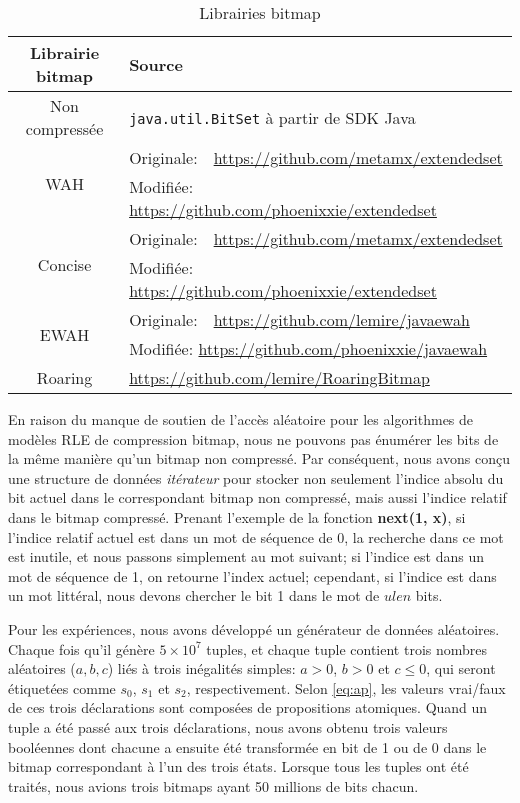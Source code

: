 \begin{table}
\centering
\begin{tabular}{|c|l|}
\hline
Librairie bitmap & Source \\
\hline
Non compressée & \texttt{java.util.BitSet} à partir de SDK Java  \\
\hline
\multirow{2}{*}{WAH} & Originale:\ \ \url{https://github.com/metamx/extendedset} \\
& Modifiée: \url{https://github.com/phoenixxie/extendedset} \\
\hline
\multirow{2}{*}{Concise} & Originale:\ \ \url{https://github.com/metamx/extendedset} \\
& Modifiée: \url{https://github.com/phoenixxie/extendedset} \\
\hline
\multirow{2}{*}{EWAH} & Originale:\ \ \url{https://github.com/lemire/javaewah} \\
& Modifiée: \url{https://github.com/phoenixxie/javaewah} \\
\hline
Roaring & \url{https://github.com/lemire/RoaringBitmap} \\
\hline
\end{tabular}
\caption{Librairies bitmap}
\label{table:bmlibs}
\end{table}

En raison du manque de soutien de l'accès aléatoire pour les algorithmes de modèles RLE de compression bitmap, nous ne pouvons pas énumérer les bits de la même manière qu'un bitmap non compressé. Par conséquent, nous avons conçu une structure de données \emph{itérateur} pour stocker non seulement l'indice absolu du bit actuel dans le correspondant bitmap non compressé, mais aussi l'indice relatif dans le bitmap compressé. Prenant l'exemple de la fonction \textbf{next(1, x)}, si l'indice relatif actuel est dans un mot de séquence de 0, la recherche dans ce mot est inutile, et nous passons simplement au mot suivant; si l'indice est dans un mot de séquence de 1, on retourne l'index actuel; cependant, si l'indice est dans un mot littéral, nous devons chercher le bit 1 dans le mot de $ulen$ bits.

Pour les expériences, nous avons développé un générateur de données aléatoires. Chaque fois qu'il génère $5 \times 10^7$ tuples, et chaque tuple contient trois nombres aléatoires ($a, b, c$) liés à trois inégalités simples: $a > 0$, $b > 0$ et $c \leq 0$, qui seront étiquetées comme $s_0$, $s_1$ et $s_2$, respectivement. Selon \eqref{eq:ap}, les valeurs vrai/faux de ces trois déclarations sont composées de propositions atomiques. Quand un tuple a été passé aux trois déclarations, nous avons obtenu trois valeurs booléennes dont chacune a ensuite été transformée en bit de 1 ou de 0 dans le bitmap correspondant à l'un des trois états. Lorsque tous les tuples ont été traités, nous avions trois bitmaps ayant 50 millions de bits chacun.

